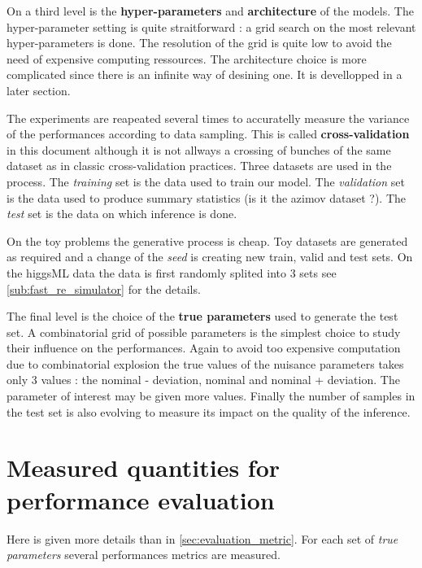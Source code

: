 On a third level is the \textbf{hyper-parameters} and \textbf{architecture} of the models.
The hyper-parameter setting is quite straitforward : a grid search on the most relevant hyper-parameters is done.
The resolution of the grid is quite low to avoid the need of expensive computing ressources.
The architecture choice is more complicated since there is an infinite way of desining one.
It is devellopped in a later section\needcite.

The experiments are reapeated several times to accuratelly measure the variance of the performances according to data sampling.
This is called \textbf{cross-validation} in this document although it is not allways a crossing of bunches of the same dataset as in classic cross-validation practices.
Three datasets are used in the process.
The \emph{training} set is the data used to train our model.
The \emph{validation} set is the data used to produce summary statistics (is it the azimov dataset ?).
The \emph{test} set is the data on which inference is done.

On the toy problems the generative process is cheap.
Toy datasets are generated as required and a change of the \emph{seed} is creating new train, valid and test sets.
On the higgsML data the data is first randomly splited into 3 sets see \autoref{sub:fast_re_simulator} for the details.

The final level is the choice of the \textbf{true parameters} used to generate the test set.
A combinatorial grid of possible parameters is the simplest choice to study their influence on the performances.
Again to avoid too expensive computation due to combinatorial explosion the true values of the nuisance parameters takes only 3 values :
the nominal - deviation, nominal and nominal + deviation.
The parameter of interest may be given more values.
Finally the number of samples in the test set is also evolving to measure its impact on the quality of the inference.


\section{Measured quantities for performance evaluation} %
\label{sec:measured_quantities_for_performance_evaluation}


Here is given more details than in \autoref{sec:evaluation_metric}.
For each set of \emph{true parameters} several performances metrics are measured.

